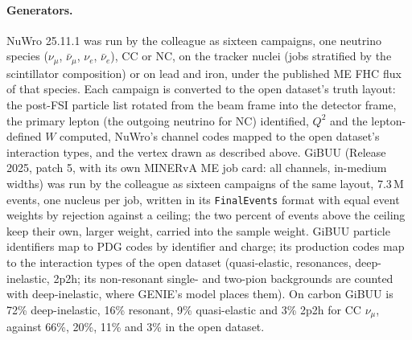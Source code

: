 \documentclass[11pt]{article}
\begin{document}
\begin{table}[h]\centering\footnotesize

\caption{Composition by flavour and current of the open dataset in the full training volume and of the inclusive
NuWro and GiBUU samples (weighted shares), and the number of events; the generator samples are at \nIncFrac{} of
the open dataset's exposure.}
\label{tab:inc-comp}
\end{table}

\paragraph{Generators.} NuWro 25.11.1 was run by the colleague as sixteen campaigns, one neutrino species
($\nu_\mu$, $\bar\nu_\mu$, $\nu_e$, $\bar\nu_e$), CC or NC, on the tracker nuclei (jobs stratified by the scintillator
composition) or on lead and iron, under the published ME FHC flux of that species. Each campaign is converted to the
open dataset's truth layout: the post-FSI particle list rotated from the beam frame into the detector frame, the
primary lepton (the outgoing neutrino for NC) identified, $Q^2$ and the lepton-defined $W$ computed, NuWro's
channel codes mapped to the open dataset's interaction types, and the vertex drawn as described above. GiBUU (Release 2025, patch 5, with its own MINERvA ME job card: all channels, in-medium widths) was run by the
colleague as sixteen campaigns of the same layout, 7.3\,M events, one nucleus per job, written in its
\texttt{FinalEvents} format with equal event weights by rejection against a ceiling; the two percent of events
above the ceiling keep their own, larger weight, carried into the sample weight. GiBUU particle identifiers map to
PDG codes by identifier and charge; its production codes map to the interaction types of the open dataset
(quasi-elastic, resonances, deep-inelastic, 2p2h; its non-resonant single- and two-pion backgrounds are counted
with deep-inelastic, where GENIE's model places them). On carbon GiBUU is 72\% deep-inelastic, 16\% resonant,
9\% quasi-elastic and 3\% 2p2h for CC $\nu_\mu$, against 66\%, 20\%, 11\% and 3\% in the open dataset.
\end{document}

